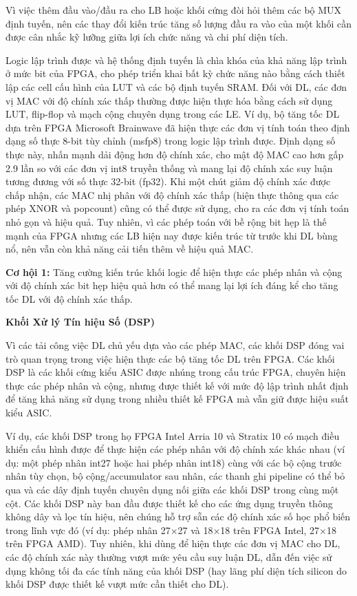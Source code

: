 \documentclass[a4paper]{article}
\begin{document}
Vì việc thêm đầu vào/đầu ra cho LB hoặc khối cứng đòi hỏi thêm các bộ MUX định tuyến, nên các thay đổi kiến trúc tăng số lượng đầu ra vào của một khối cần được cân nhắc kỹ lưỡng giữa lợi ích chức năng và chi phí diện tích.

Logic lập trình được và hệ thống định tuyến là chìa khóa của khả năng lập trình ở mức bit của FPGA, cho phép triển khai bất kỳ chức năng nào bằng cách thiết lập các cell cấu hình của LUT và các bộ định tuyến SRAM. Đối với DL, các đơn vị MAC với độ chính xác thấp thường được hiện thực hóa bằng cách sử dụng LUT, flip-flop và mạch cộng chuyên dụng trong các LE. Ví dụ, bộ tăng tốc DL dựa trên FPGA Microsoft Brainwave đã hiện thực các đơn vị tính toán theo định dạng số thực 8-bit tùy chỉnh (msfp8) trong logic lập trình được. Định dạng số thực này, nhấn mạnh dải động hơn độ chính xác, cho mật độ MAC cao hơn gấp 2.9 lần so với các đơn vị int8 truyền thống và mang lại độ chính xác suy luận tương đương với số thực 32-bit (fp32). Khi một chút giảm độ chính xác được chấp nhận, các MAC nhị phân với độ chính xác thấp (hiện thực thông qua các phép XNOR và popcount) cũng có thể được sử dụng, cho ra các đơn vị tính toán nhỏ gọn và hiệu quả. Tuy nhiên, vì các phép toán với bề rộng bit hẹp là thế mạnh của FPGA nhưng các LB hiện nay được kiến trúc từ trước khi DL bùng nổ, nên vẫn còn khả năng cải tiến thêm về hiệu quả MAC.

\textbf{Cơ hội 1:} Tăng cường kiến trúc khối logic để hiện thực các phép nhân và cộng với độ chính xác bit hẹp hiệu quả hơn có thể mang lại lợi ích đáng kể cho tăng tốc DL với độ chính xác thấp.

\textbf{Khối Xử lý Tín hiệu Số (DSP)}

Vì các tải công việc DL chủ yếu dựa vào các phép MAC, các khối DSP đóng vai trò quan trọng trong việc hiện thực các bộ tăng tốc DL trên FPGA. Các khối DSP là các khối cứng kiểu ASIC được nhúng trong cấu trúc FPGA, chuyên hiện thực các phép nhân và cộng, nhưng được thiết kế với mức độ lập trình nhất định để tăng khả năng sử dụng trong nhiều thiết kế FPGA mà vẫn giữ được hiệu suất kiểu ASIC.

Ví dụ, các khối DSP trong họ FPGA Intel Arria 10 và Stratix 10 có mạch điều khiển cấu hình được để thực hiện các phép nhân với độ chính xác khác nhau (ví dụ: một phép nhân int27 hoặc hai phép nhân int18) cùng với các bộ cộng trước nhân tùy chọn, bộ cộng/accumulator sau nhân, các thanh ghi pipeline có thể bỏ qua và các dây định tuyến chuyên dụng nối giữa các khối DSP trong cùng một cột. Các khối DSP này ban đầu được thiết kế cho các ứng dụng truyền thông không dây và lọc tín hiệu, nên chúng hỗ trợ sẵn các độ chính xác số học phổ biến trong lĩnh vực đó (ví dụ: phép nhân 27×27 và 18×18 trên FPGA Intel, 27×18 trên FPGA AMD). Tuy nhiên, khi dùng để hiện thực các đơn vị MAC cho DL, các độ chính xác này thường vượt mức yêu cầu suy luận DL, dẫn đến việc sử dụng không tối đa các tính năng của khối DSP (hay lãng phí diện tích silicon do khối DSP được thiết kế vượt mức cần thiết cho DL).
\end{document}
